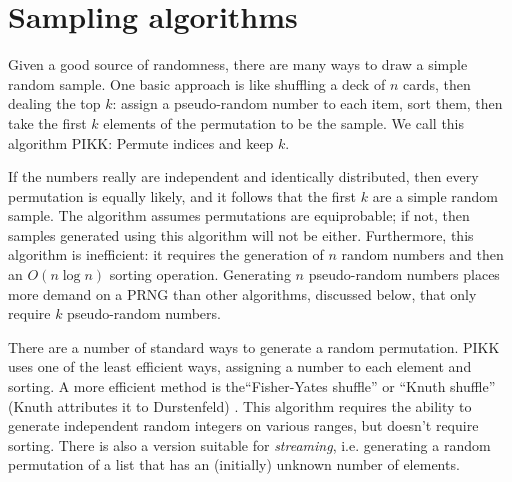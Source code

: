 \documentclass[graybox]{svmult}
\begin{document}
\section{Sampling algorithms}
\label{sec:algorithms}


Given a good source of randomness, there are many ways to draw a simple random sample.
One basic approach is like shuffling a deck of $n$ cards, then dealing the top $k$:
assign a pseudo-random number to each item, sort them, then take the first $k$ elements of the permutation to be the sample.
We call this algorithm PIKK: Permute indices and keep $k$.

If the numbers really are independent and identically distributed, then every permutation is equally likely, 
and it follows that the first $k$ are a simple random sample.
The algorithm assumes permutations are equiprobable; if not, then samples generated using this algorithm will not be either.
Furthermore, this algorithm is inefficient: it requires the generation of $n$ random numbers and then an $O(n\log n)$ sorting operation.
Generating $n$ pseudo-random numbers places more demand on a PRNG than other algorithms, discussed below, that only require $k$ pseudo-random numbers.

%

There are a number of standard ways to generate a random permutation.
PIKK uses one of the least efficient ways, assigning a number to each element and sorting.
A more efficient method is the``Fisher-Yates shuffle'' or ``Knuth shuffle'' (Knuth attributes it to Durstenfeld) \cite{knuth_art_1997}.
This algorithm requires the ability to generate independent random integers on various ranges, but doesn't require sorting.
There is also a version suitable for \emph{streaming}, i.e. generating a random permutation of a list that has an (initially) unknown number of elements.
\end{document}

